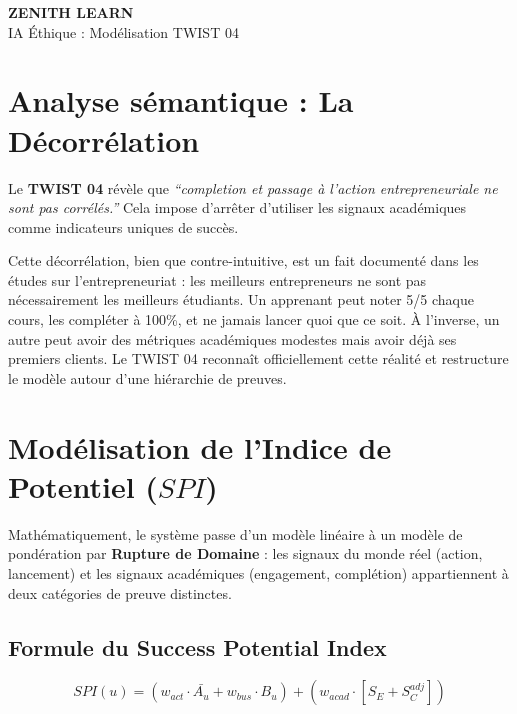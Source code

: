 \documentclass[11pt,a4paper]{article}
\begin{document}
\begin{tcolorbox}[enhanced, colback=BrandDark, colframe=BrandPrimary, arc=10pt, boxrule=2pt, halign=center]
    \vspace{0.3cm}
    {\Huge \bfseries \color{white} ZENITH LEARN} \\
    \vspace{0.2cm}
    {\Large \color{BrandPrimary} IA Éthique : Modélisation TWIST 04} \\
    \vspace{0.3cm}
\end{tcolorbox}

\section{Analyse sémantique : La Décorrélation}
Le \textbf{TWIST 04} révèle que \textit{``completion et passage à l'action entrepreneuriale ne sont pas corrélés.''} Cela impose d'arrêter d'utiliser les signaux académiques comme indicateurs uniques de succès.

Cette décorrélation, bien que contre-intuitive, est un fait documenté dans les études sur l'entrepreneuriat : les meilleurs entrepreneurs ne sont pas nécessairement les meilleurs étudiants. Un apprenant peut noter 5/5 chaque cours, les compléter à 100\%, et ne jamais lancer quoi que ce soit. À l'inverse, un autre peut avoir des métriques académiques modestes mais avoir déjà ses premiers clients. Le TWIST 04 reconnaît officiellement cette réalité et restructure le modèle autour d'une hiérarchie de preuves.

\section{Modélisation de l'Indice de Potentiel ($SPI$)}
Mathématiquement, le système passe d'un modèle linéaire à un modèle de pondération par \textbf{Rupture de Domaine} : les signaux du monde réel (action, lancement) et les signaux académiques (engagement, complétion) appartiennent à deux catégories de preuve distinctes.

\subsection{Formule du Success Potential Index}
\begin{equation}
SPI(u) = (w_{act} \cdot \bar{A_u} + w_{bus} \cdot B_u) + (w_{acad} \cdot [S_E + S_C^{adj}])
\end{equation}
\end{document}

